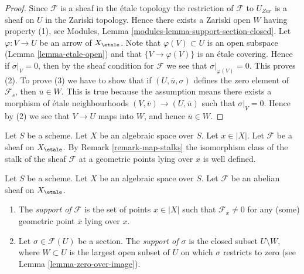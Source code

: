 \begin{proof}
Since $\mathcal{F}$ is a sheaf in the \'etale topology the restriction of
$\mathcal{F}$ to $U_{Zar}$ is a sheaf on $U$ in the Zariski topology.
Hence there exists a Zariski open $W$ having property (1), see
Modules, Lemma \ref{modules-lemma-support-section-closed}. Let
$\varphi : V \to U$ be an arrow of $X_\etale$. Note that
$\varphi(V) \subset U$ is an open subspace
(Lemma \ref{lemma-etale-open})
and that $\{V \to \varphi(V)\}$ is an \'etale covering. Hence if
$\sigma|_V = 0$, then by the sheaf condition for $\mathcal{F}$ we
see that $\sigma|_{\varphi(V)} = 0$. This proves (2).
To prove (3) we have to show that if $(U, \overline{u}, \sigma)$
defines the zero element of $\mathcal{F}_{\overline{s}}$, then
$\overline{u} \in W$. This is true because the assumption means
there exists a morphism of \'etale neighbourhoods
$(V, \overline{v}) \to (U, \overline{u})$ such that
$\sigma|_V = 0$. Hence by (2) we see that $V \to U$ maps into $W$, and
hence $\overline{u} \in W$.
\end{proof}

\noindent
Let $S$ be a scheme.
Let $X$ be an algebraic space over $S$.
Let $x \in |X|$.
Let $\mathcal{F}$ be a sheaf on $X_\etale$. By
Remark \ref{remark-map-stalks}
the isomorphism class of the stalk of the sheaf $\mathcal{F}$
at a geometric points lying over $x$ is well defined.

\begin{definition}
\label{definition-support}
Let $S$ be a scheme.
Let $X$ be an algebraic space over $S$.
Let $\mathcal{F}$ be an abelian sheaf on $X_\etale$.
\begin{enumerate}
\item The {\it support of $\mathcal{F}$} is the set of
points $x \in |X|$ such that $\mathcal{F}_{\overline{x}} \not = 0$
for any (some) geometric point $\overline{x}$ lying over $x$.
\item Let $\sigma \in \mathcal{F}(U)$ be a section.
The {\it support of $\sigma$} is the closed subset $U \setminus W$, where
$W \subset U$ is the largest open subset of $U$ on which $\sigma$
restricts to zero (see
Lemma \ref{lemma-zero-over-image}).
\end{enumerate}
\end{definition}

